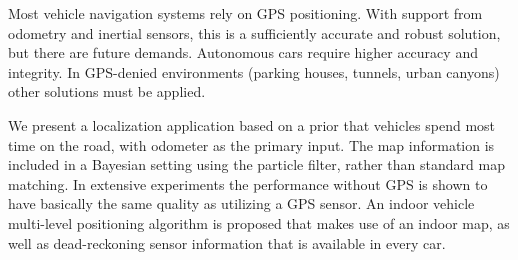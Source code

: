 Most vehicle navigation systems rely on GPS positioning. With support from odometry and inertial sensors, this is a sufficiently accurate and robust solution, but there are future demands. Autonomous cars require higher accuracy and integrity. In GPS-denied environments (parking houses, tunnels, urban canyons) other solutions must be applied.

We present a localization application based on a prior that vehicles spend most time on the road, with odometer as the primary input. The map information is included in a Bayesian setting using the particle filter, rather than standard map matching. In extensive experiments the performance without GPS is shown to have basically the same quality as utilizing a GPS sensor. An indoor vehicle multi-level positioning algorithm is proposed that makes use of an indoor map, as well as dead-reckoning sensor information that is available in every car.